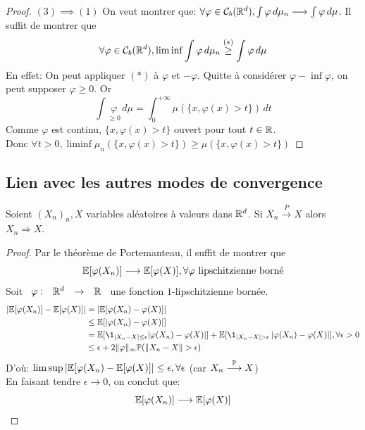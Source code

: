\documentclass[]{report}
\begin{document}
\begin{proof}
        $(3)\implies (1)$ On veut montrer que: $\forall \varphi\in \mathcal{C}_b(\mathbb{R}^d), \int \varphi \,d\mu_n \longrightarrow \int \varphi\,d\mu$. Il suffit de montrer que
        \[\forall \varphi\in \mathcal{C}_b(\mathbb{R}^d), \liminf \int \varphi\,d\mu_n\overset{(*)}{\ge} \int \varphi\,d\mu\]
        En effet: On peut appliquer $(*)$ à $\varphi$ et $-\varphi$. Quitte à considérer $\varphi-\inf \varphi$, on peut supposer $\varphi\ge 0$. Or
        \[\int \underset{\ge 0}{\varphi}\,d\mu=\int_{0}^{+\infty}\mu\left(\{x,\varphi(x)>t\}\right)\,dt\]
        Comme $\varphi$ est continu, $\{x,\varphi(x)>t\}$ ouvert pour tout $t\in \mathbb{R}$.\\
        Donc $\forall t>0,\liminf \mu_n\left(\{x,\varphi(x)>t\}\right)\ge \mu(\{x,\varphi(x)>t\})$
    \end{proof}

    \subsection*{Lien avec les autres modes de convergence}

    \begin{prop}{}{}
        Soient $(X_n)_n,X$ variables aléatoires à valeurs dans $\mathbb{R}^d$. Si $X_n\overset{P}{\longrightarrow} X$ alors $X_n\Longrightarrow X$.
    \end{prop}

    \begin{proof}
        Par le théorème de Portemanteau, il suffit de montrer que
        \[\mathbb{E}[\varphi(X_n)]\longrightarrow \mathbb{E}[\varphi(X)],\forall \varphi\text{ lipschitzienne borné}\]
        Soit $\begin{array}{ccccc} \varphi : & \mathbb{R}^d & \to & \mathbb{R} \end{array}$ une fonction $1$-lipschitzienne bornée.
        \begin{align*}
            \left|\Ea[\varphi(X_n)]-\Ea[\varphi(X)]\right|&=\left|\Ea[\varphi(X_n)-\varphi(X)]\right|\\
            &\le \Ea[|\varphi(X_n)-\varphi(X)|]\\
            &=\Ea[\1_{|X_n-X|\le \epsilon}|\varphi(X_n)-\varphi(X)|]+\Ea[\1_{|X_n-X|>\epsilon}\left|\varphi(X_n)-\varphi(X)\right|],\forall \epsilon>0\\
            &\le \epsilon +2\norme{\varphi}_\infty \Pa(\norme{X_n-X}>\epsilon)
        \end{align*}
        D'où: $\limsup|\mathbb{E}[\varphi(X_n)-\mathbb{E}[\varphi(X)]|\le \epsilon,\forall \epsilon$ (car $X_n\overset{\mathbb{P}}{\longrightarrow} X$)\\
        En faisant tendre $\epsilon \to 0$, on conclut que:
        \[\mathbb{E}[\varphi(X_n)]\longrightarrow \mathbb{E}[\varphi(X)]\]
    \end{proof}
    
\end{document}

